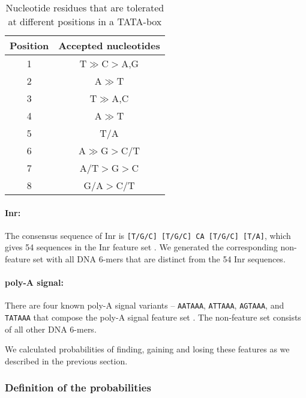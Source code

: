 \documentclass[12pt,a4paper]{article}
\begin{document}
\begin{table}[!t]
\centering
\begin{tabular}{c c}
\toprule
Position  & Accepted nucleotides \\ \midrule
1         & T$\gg$C$>$A,G        \\ \midrule
2         & A$\gg$T               \\ \midrule
3         & T$\gg$A,C             \\ \midrule
4         & A$\gg$T               \\ \midrule
5         & T/A                   \\ \midrule
6         & A$\gg$G$>$C/T         \\ \midrule
7         & A/T$>$G$>$C           \\ \midrule
8         & G/A$>$C/T             \\ \bottomrule
\end{tabular}
\caption{Nucleotide residues that are tolerated at different positions in a TATA-box \citep[based on][]{tata1}}
\label{tatatab}
\end{table}


\paragraph{Inr:} The consensus sequence of Inr is \texttt{[T/G/C] [T/G/C] CA [T/G/C] [T/A]}, which gives 54 sequences in the Inr feature set \citep{Inr}. We generated the corresponding non-feature set with all DNA 6-mers that are distinct from the 54 Inr sequences.

\paragraph{poly-A signal:} There are four known poly-A signal variants -- \texttt{AATAAA}, \texttt{ATTAAA}, \texttt{AGTAAA}, and \texttt{TATAAA} that compose the poly-A signal feature set \citep{polyA}. The non-feature set consists of all other DNA 6-mers.

\vspace{1\baselineskip}

We calculated probabilities of finding, gaining and losing these features as we described in the previous section.

\subsubsection{Definition of the probabilities}
\end{document}

